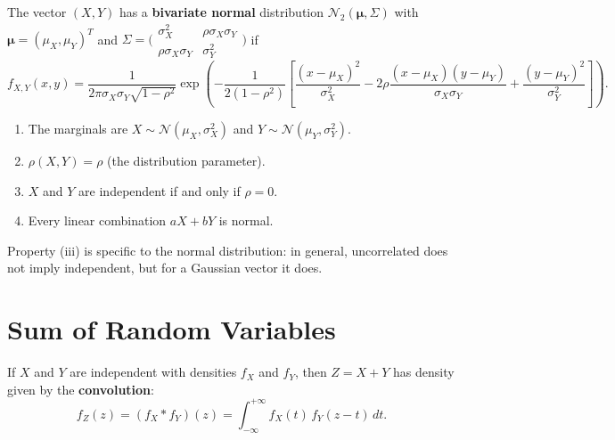 \begin{definition}
The vector $(X, Y)$ has a \textbf{bivariate normal} distribution
$\mathcal{N}_2(\boldsymbol{\mu}, \Sigma)$ with
$\boldsymbol{\mu} = (\mu_X, \mu_Y)^T$ and
$\Sigma = \bigl(\begin{smallmatrix} \sigma_X^2 & \rho\sigma_X\sigma_Y \\
\rho\sigma_X\sigma_Y & \sigma_Y^2 \end{smallmatrix}\bigr)$ if
\[
    f_{X,Y}(x,y) = \frac{1}{2\pi\sigma_X\sigma_Y\sqrt{1-\rho^2}}
    \exp\!\left(-\frac{1}{2(1-\rho^2)}\left[
    \frac{(x-\mu_X)^2}{\sigma_X^2}
    - 2\rho\frac{(x-\mu_X)(y-\mu_Y)}{\sigma_X\sigma_Y}
    + \frac{(y-\mu_Y)^2}{\sigma_Y^2}
    \right]\right).
\]
\end{definition}

\begin{theorem}
\begin{enumerate}[label=(\roman*)]
    \item The marginals are $X \sim \mathcal{N}(\mu_X, \sigma_X^2)$ and
          $Y \sim \mathcal{N}(\mu_Y, \sigma_Y^2)$.
    \item $\rho(X,Y) = \rho$ (the distribution parameter).
    \item $X$ and $Y$ are independent if and only if $\rho = 0$.
    \item Every linear combination $aX + bY$ is normal.
\end{enumerate}
\end{theorem}

\begin{remark}
Property (iii) is specific to the normal distribution: in general, uncorrelated
does not imply independent, but for a Gaussian vector it does.
\end{remark}

\section{Sum of Random Variables}

\begin{theorem}[Convolution]
If $X$ and $Y$ are independent with densities $f_X$ and $f_Y$, then
$Z = X + Y$ has density given by the \textbf{convolution}:
\[
    f_Z(z) = (f_X * f_Y)(z) = \int_{-\infty}^{+\infty} f_X(t)\,f_Y(z-t)\,dt.
\]
\end{theorem}

